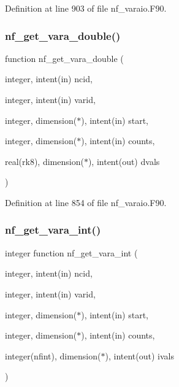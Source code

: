 Definition at line 903 of file nf\+\_\+varaio.\+F90.

\mbox{\label{nf__varaio_8F90_a642bebcbf3a83a4a2dcd251465321ce2}} 
\subsubsection{\texorpdfstring{nf\+\_\+get\+\_\+vara\+\_\+double()}{nf\_get\_vara\_double()}}
{\footnotesize\ttfamily function nf\+\_\+get\+\_\+vara\+\_\+double (\begin{DoxyParamCaption}\item[{integer, intent(in)}]{ncid,  }\item[{integer, intent(in)}]{varid,  }\item[{integer, dimension($\ast$), intent(in)}]{start,  }\item[{integer, dimension($\ast$), intent(in)}]{counts,  }\item[{real(rk8), dimension($\ast$), intent(out)}]{dvals }\end{DoxyParamCaption})}



Definition at line 854 of file nf\+\_\+varaio.\+F90.

\mbox{\label{nf__varaio_8F90_a84fa4e1adc7b124887866d37516049e3}} 
\subsubsection{\texorpdfstring{nf\+\_\+get\+\_\+vara\+\_\+int()}{nf\_get\_vara\_int()}}
{\footnotesize\ttfamily integer function nf\+\_\+get\+\_\+vara\+\_\+int (\begin{DoxyParamCaption}\item[{integer, intent(in)}]{ncid,  }\item[{integer, intent(in)}]{varid,  }\item[{integer, dimension($\ast$), intent(in)}]{start,  }\item[{integer, dimension($\ast$), intent(in)}]{counts,  }\item[{integer(nfint), dimension($\ast$), intent(out)}]{ivals }\end{DoxyParamCaption})}



